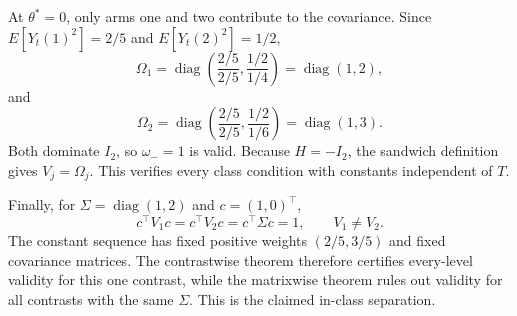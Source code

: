 At \(\theta^*=0\), only arms one and two contribute to the covariance. Since \(E[Y_t(1)^2]=2/5\) and \(E[Y_t(2)^2]=1/2\),
\[
 \Omega_1=\operatorname{diag}\left(\frac{2/5}{2/5},\frac{1/2}{1/4}\right)
 =\operatorname{diag}(1,2),
\]
and
\[
 \Omega_2=\operatorname{diag}\left(\frac{2/5}{2/5},\frac{1/2}{1/6}\right)
 =\operatorname{diag}(1,3).
\]
Both dominate \(I_2\), so \(\omega_-=1\) is valid. Because \(H=-I_2\), the sandwich definition gives \(V_j=\Omega_j\). This verifies every class condition with constants independent of \(T\).

Finally, for \(\Sigma=\operatorname{diag}(1,2)\) and \(c=(1,0)^\top\),
\[
 c^\top V_1c=c^\top V_2c=c^\top\Sigma c=1,
 \qquad V_1\ne V_2.
\]
The constant sequence has fixed positive weights \((2/5,3/5)\) and fixed covariance matrices. The contrastwise theorem therefore certifies every-level validity for this one contrast, while the matrixwise theorem rules out validity for all contrasts with the same \(\Sigma\). This is the claimed in-class separation.